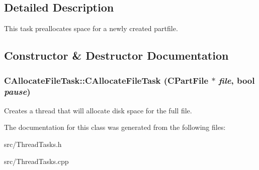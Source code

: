 \subsection{Detailed Description}
This task preallocates space for a newly created partfile. 

\subsection{Constructor \& Destructor Documentation}
\subsubsection[{CAllocateFileTask}]{\setlength{\rightskip}{0pt plus 5cm}CAllocateFileTask::CAllocateFileTask ({\bf CPartFile} $\ast$ {\em file}, \/  bool {\em pause})}\label{classCAllocateFileTask_a8f9cbc99dbbbd032dbc3eb386bf2e7b6}


Creates a thread that will allocate disk space for the full file. 

The documentation for this class was generated from the following files:\begin{DoxyCompactItemize}
\item 
src/ThreadTasks.h\item 
src/ThreadTasks.cpp\end{DoxyCompactItemize}
